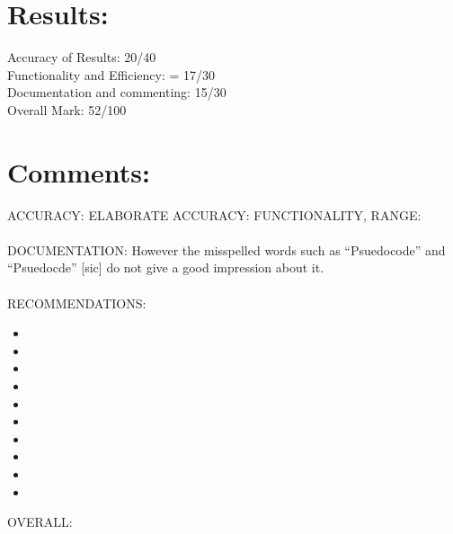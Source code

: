 \documentclass[11pt]{article} %
\begin{document}

\section{Results:}

Accuracy of Results: 20/40 \\
Functionality and Efficiency: = 17/30 \\ 
Documentation and commenting: 15/30 \\ 
Overall Mark: 52/100 \\

\section{Comments:}

ACCURACY:
ELABORATE ACCURACY:
FUNCTIONALITY, RANGE:
\\
\\ 
DOCUMENTATION:
However the misspelled words such as ``Psuedocode'' and ``Psuedocde'' [sic] do not give a good impression about it. \\
\\
RECOMMENDATIONS:
\begin{itemize}
\item {}
\item {}
\item {}
\item {}
\item {}
\item {}
\item {}
\item {}
\item {}
\item {}
\end{itemize}
OVERALL: 
\end{document}
